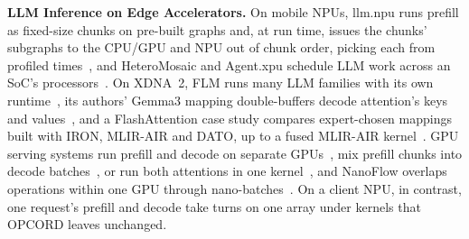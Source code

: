\textbf{LLM Inference on Edge Accelerators.}
On mobile NPUs, llm.npu runs prefill as fixed-size chunks on pre-built graphs and, at run time, issues the chunks' subgraphs to the CPU/GPU and NPU out of chunk order, picking each from profiled times~\citep{xu2025llmnpu}, and HeteroMosaic and Agent.xpu schedule LLM work across an SoC's processors~\citep{jun2026heteromosaic,wei2025agentxpu}.
On XDNA~2, FLM runs many LLM families with its own runtime~\citep{fastflowlm-repo}, its authors' Gemma3 mapping double-buffers decode attention's keys and values~\citep{du2026gemma3}, and a FlashAttention case study compares expert-chosen mappings built with IRON, MLIR-AIR and DATO, up to a fused MLIR-AIR kernel~\citep{wang2026flashattention}.
GPU serving systems run prefill and decode on separate GPUs~\citep{zhong2024distserve,patel2024splitwise}, mix prefill chunks into decode batches~\citep{agrawal2024sarathi}, or run both attentions in one kernel~\citep{kamath2025pod}, and NanoFlow overlaps operations within one GPU through nano-batches~\citep{zhu2025nanoflow}.
On a client NPU, in contrast, one request's prefill and decode take turns on one array under kernels that OPCORD leaves unchanged.

